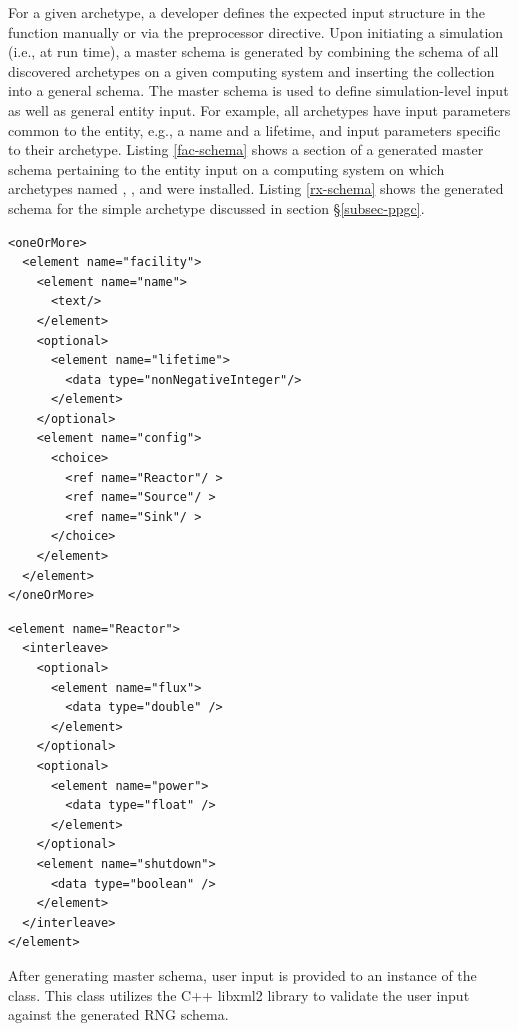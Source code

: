 For a given archetype, a developer defines the expected input structure in the
 function manually or via the 
preprocessor directive. Upon initiating a \Cyclus simulation (i.e., at run
time), a master schema is generated by combining the schema of all discovered
archetypes on a given computing system and inserting the collection into a
general \Cyclus schema. The master \Cyclus schema is used to define
simulation-level input as well as general entity input. For example, all
 archetypes have input parameters common to the
 entity, e.g., a name and a lifetime, and input
parameters specific to their archetype. Listing \ref{fac-schema} shows a
section of a generated \Cyclus master schema pertaining to the
 entity input on a computing system on which archetypes
named , , and  were installed. Listing
\ref{rx-schema} shows the generated schema for the simple 
archetype discussed in section \S \ref{subsec-ppgc}.

\lstset{language=XML}
\begin{lstlisting}[caption={Generated \Cyclus Facility Schema for a Computing System with 
      \code{Reactor}, \code{Source}, and \code{Sink} Archetypes Installed}, 
    label=fac-schema]
<oneOrMore>
  <element name="facility">
    <element name="name"> 
      <text/> 
    </element>
    <optional>
      <element name="lifetime"> 
        <data type="nonNegativeInteger"/> 
      </element>
    </optional>
    <element name="config">
      <choice>
        <ref name="Reactor"/ >
        <ref name="Source"/ >
        <ref name="Sink"/ >
      </choice>
    </element>
  </element>
</oneOrMore>
\end{lstlisting}

\lstset{language=XML}
\begin{lstlisting}[caption={Generated Simple Reactor Schema}, 
                   label=rx-schema]
<element name="Reactor">
  <interleave>
    <optional>
      <element name="flux">
        <data type="double" />
      </element>
    </optional>
    <optional>
      <element name="power">
        <data type="float" />
      </element>
    </optional>
    <element name="shutdown">
      <data type="boolean" />
    </element>
  </interleave>
</element>
\end{lstlisting}

After generating master \Cyclus schema, user input is provided to an instance
of the  class. This class utilizes the C++ libxml2
library to validate the user input against the generated \gls{RNG} schema. 

